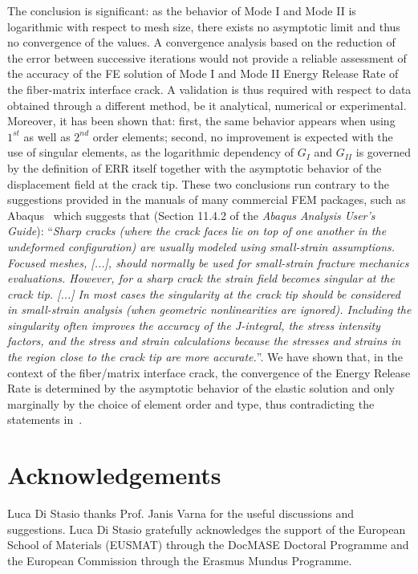 The conclusion is significant: as the behavior of Mode I and Mode II is logarithmic with respect to mesh size, there exists no asymptotic limit and thus no convergence of the values. A convergence analysis based on the reduction of the error between successive iterations would not provide a reliable assessment of the accuracy of the FE solution of Mode I and Mode II Energy Release Rate of the fiber-matrix interface crack. A validation is thus required with respect to data obtained through a different method, be it analytical, numerical or experimental. Moreover, it has been shown that: first, the same behavior appears when using $1^{st}$ as well as $2^{nd}$ order elements; second, no improvement is expected with the use of singular elements, as the logarithmic dependency of $G_{I}$ and $G_{II}$ is governed by the definition of ERR itself together with the asymptotic behavior of the displacement field at the crack tip. These two conclusions run contrary to the suggestions provided in the manuals of many commercial FEM packages, such as Abaqus~\cite{abq12} which suggests that (Section 11.4.2 of the \emph{Abaqus Analysis User's Guide}): ``\textit{Sharp cracks (where the crack faces lie on top of one another in the undeformed configuration) are usually modeled using small-strain assumptions. Focused meshes, [...], should normally be used for small-strain fracture mechanics evaluations. However, for a sharp crack the strain field becomes singular at the crack tip. [...] In most cases the singularity at the crack tip should be considered in small-strain analysis (when geometric nonlinearities are ignored). Including the singularity often improves the accuracy of the J-integral, the stress intensity factors, and the stress and strain calculations because the stresses and strains in the region close to the crack tip are more accurate.}''. We have shown that, in the context of the fiber/matrix interface crack, the convergence of the Energy Release Rate is determined by the asymptotic behavior of the elastic solution and only marginally by the choice of element order and type, thus contradicting the statements in~\cite{abq12}.

\FloatBarrier

\section*{Acknowledgements}

Luca Di Stasio thanks Prof. Janis Varna for the useful discussions and suggestions. Luca Di Stasio gratefully acknowledges the support of the European School of Materials (EUSMAT) through the DocMASE Doctoral Programme and the European Commission through the Erasmus Mundus Programme.

